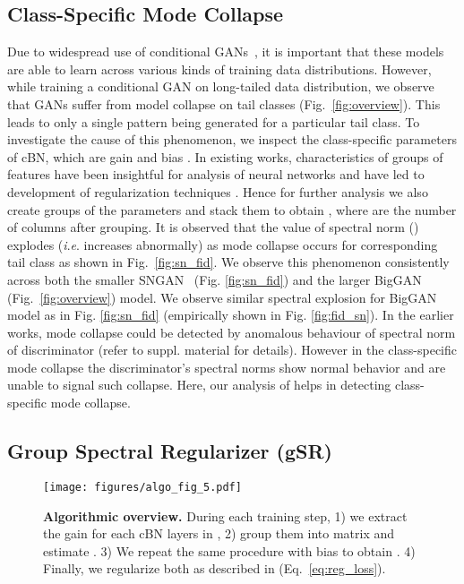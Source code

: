\documentclass[runningheads,table]{llncs}
\newcommand{\ie}{\textit{i}.\textit{e}. }
\begin{document}
\subsection{Class-Specific Mode Collapse}
\label{subsec:class-specific-collapse}
Due to widespread use of conditional GANs~\cite{brock2018large, miyato2018cgans}, it is important that these models are able to learn across various kinds of training data distributions.
However, while training a conditional GAN on long-tailed data distribution, we observe that 
GANs suffer from model collapse on tail classes (Fig.~\ref{fig:overview}). This leads to only a single pattern being generated for a particular tail class. To investigate the cause of this phenomenon, we inspect the class-specific parameters of cBN, which are gain  and bias .
In existing works, characteristics of groups of features have been insightful for analysis of neural networks and have led to development of regularization techniques  \cite{wu2018group, huang2021group}.
Hence for further analysis we also create  groups of the  parameters and stack them to obtain , where  are the number of columns after grouping. It is observed that the value of spectral norm () explodes (\ie increases abnormally) as mode collapse occurs for corresponding tail class   as shown in Fig.~\ref{fig:sn_fid}. We observe this phenomenon consistently across both the smaller SNGAN~\cite{miyato2018spectral} (Fig. \ref{fig:sn_fid}) and the larger BigGAN~\cite{brock2018large} (Fig.~\ref{fig:overview}) model. We observe similar spectral explosion for BigGAN model as in Fig. \ref{fig:sn_fid} (empirically shown in Fig. \ref{fig:fid_sn}). In the earlier works, mode collapse could be detected by anomalous behaviour of spectral norm of discriminator (refer to suppl. material for details). However in the class-specific mode collapse the discriminator's spectral norms show normal behavior and are unable to signal such collapse. Here, our analysis of  helps in detecting class-specific mode collapse. \\

\subsection{Group Spectral Regularizer (gSR)}
\label{sec:regularizer}
\begin{figure}[t]
    \centering
    \texttt{[image: figures/algo\_fig\_5.pdf]}
    \caption{\textbf{Algorithmic overview.} During each training step, 1) we extract the gain  for each cBN layers in , 2) group them into matrix  and estimate . 3) We repeat the same procedure with bias  to obtain . 4) Finally, we regularize both as described in  (Eq.~\ref{eq:reg_loss}).}
    \label{fig:algo}
\end{figure}
\end{document}
